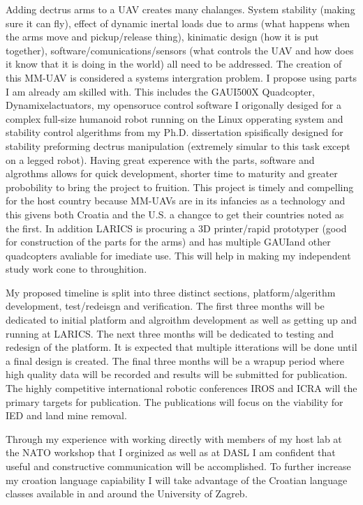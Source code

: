 \documentclass[12pt]{article}
\begin{document}
Adding dectrus arms to a UAV creates many chalanges.  
System stability (making sure it can fly), effect of dynamic inertal loads due to arms (what happens when the arms move and pickup/release thing), kinimatic design (how it is put together), software/comunications/sensors (what controls the UAV and how does it know that it is doing in the world) all need to be addressed.  
The creation of this MM-UAV is considered a systems intergration problem.  
I propose using parts I am already am skilled with.
This includes the GAUI\texttrademark 500X Quadcopter, Dynamixel\texttrademark actuators, my opensoruce control software I origonally desiged for a complex full-size humanoid robot running on the Linux opperating system and stability control algerithms from my Ph.D. dissertation spisifically designed for stability preforming dectrus manipulation (extremely simular to this task except on a legged robot).  
Having great experence with the parts, software and algrothms allows for quick development, shorter time to maturity and greater probobility to bring the project to fruition.  
This project is timely and compelling for the host country because MM-UAVs are in its infancies as a technology and this givens both Croatia and the U.S. a changce to get their countries noted as the first.  
In addition LARICS is procuring a 3D printer/rapid prototyper (good for construction of the parts for the arms) and has multiple GAUI\texttrademark and other quadcopters avaliable for imediate use.  This will help in making my independent study work cone to throughition.

My proposed timeline is split into three distinct sections, platform/algerithm development, test/redeisgn and verification.  
The first three months will be dedicated to initial platform and algroithm development as well as getting up and running at LARICS.  
The next three months will be dedicated to testing and redesign of the platform.  
It is expected that multiple itterations will be done until a final design is created.  
The final three months will be a wrapup period where high quality data will be recorded and results will be submitted for publication.  
The highly competitive international robotic conferences IROS and ICRA will the primary targets for publication.  
The publications will focus on the viability for IED and land mine removal.

Through my experience with working directly with members of my host lab at the NATO workshop that I orginized as well as at DASL I am confident that useful and constructive communication will be accomplished.  
To further increase my croation language capiability I will take advantage of the Croatian language classes available in and around the University of Zagreb. 
\end{document}
